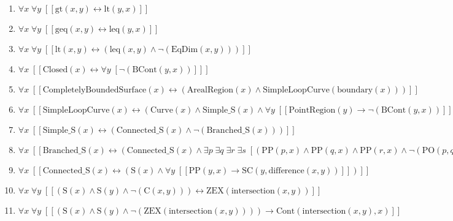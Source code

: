 \documentclass{article}
\begin{document}
\begin{enumerate}
\item $\forall x\; \forall y\;  \left[ \left[ \textrm{gt}(x,y) \leftrightarrow \textrm{lt}(y,x) \right] \right]$
\item $\forall x\; \forall y\;  \left[ \left[ \textrm{geq}(x,y) \leftrightarrow \textrm{leq}(y,x) \right] \right]$
\item $\forall x\; \forall y\;  \left[ \left[ \textrm{lt}(x,y) \leftrightarrow \left(\textrm{leq}(x,y) \land \neg \left(\textrm{EqDim}(x,y)\right)\right) \right] \right]$
\item $\forall x\;  \left[ \left[ \textrm{Closed}(x) \leftrightarrow \forall y\;  \left[ \neg \left(\textrm{BCont}(y,x)\right) \right] \right] \right]$
\item $\forall x\;  \left[ \left[ \textrm{CompletelyBoundedSurface}(x) \leftrightarrow \left(\textrm{ArealRegion}(x) \land \textrm{SimpleLoopCurve}(\textrm{boundary}(x))\right) \right] \right]$
\item $\forall x\;  \left[ \left[ \textrm{SimpleLoopCurve}(x) \leftrightarrow \left(\textrm{Curve}(x) \land \textrm{Simple\_S}(x) \land \forall y\;  \left[ \left[ \textrm{PointRegion}(y) \rightarrow \neg \left(\textrm{BCont}(y,x)\right) \right] \right]\right) \right] \right]$
\item $\forall x\;  \left[ \left[ \textrm{Simple\_S}(x) \leftrightarrow \left(\textrm{Connected\_S}(x) \land \neg \left(\textrm{Branched\_S}(x)\right)\right) \right] \right]$
\item $\forall x\;  \left[ \left[ \textrm{Branched\_S}(x) \leftrightarrow \left(\textrm{Connected\_S}(x) \land \exists p\; \exists q\; \exists r\; \exists s\;  \left[ \left(\textrm{PP}(p,x) \land \textrm{PP}(q,x) \land \textrm{PP}(r,x) \land \neg \left(\textrm{PO}(p,q)\right) \land \neg \left(\textrm{PO}(p,r)\right) \land \neg \left(\textrm{PO}(q,r)\right) \land \textrm{Covers}(p,s) \land \textrm{Covers}(q,s) \land \textrm{Covers}(r,s) \land \textrm{Cont}(s,p) \land \textrm{Cont}(s,q) \land \textrm{Cont}(s,r)\right) \right]\right) \right] \right]$
\item $\forall x\;  \left[ \left[ \textrm{Connected\_S}(x) \leftrightarrow \left(\textrm{S}(x) \land \forall y\;  \left[ \left[ \textrm{PP}(y,x) \rightarrow \textrm{SC}(y,\textrm{difference}(x,y)) \right] \right]\right) \right] \right]$
\item $\forall x\; \forall y\;  \left[ \left[ \left(\textrm{S}(x) \land \textrm{S}(y) \land \neg \left(\textrm{C}(x,y)\right)\right) \leftrightarrow \textrm{ZEX}(\textrm{intersection}(x,y)) \right] \right]$
\item $\forall x\; \forall y\;  \left[ \left[ \left(\textrm{S}(x) \land \textrm{S}(y) \land \neg \left(\textrm{ZEX}(\textrm{intersection}(x,y))\right)\right) \rightarrow \textrm{Cont}(\textrm{intersection}(x,y),x) \right] \right]$

\end{enumerate}
\end{document}
